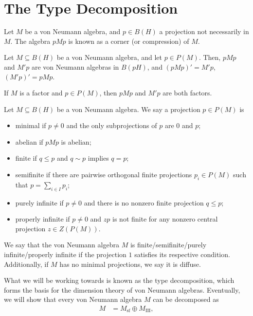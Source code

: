 \documentclass[10pt]{mypackage}
\begin{document}
\section{The Type Decomposition}%
\begin{definition}
  Let $M$ be a von Neumann algebra, and $p\in B(H)$ a projection not necessarily in $M$. The algebra $pMp$ is known as a corner (or compression) of $M$.
\end{definition}
\begin{theorem}
  Let $M\subseteq B(H)$ be a von Neumann algebra, and let $p\in P(M)$. Then, $pMp$ and $M'p$ are von Neumann algebras in $B(pH)$, and $\left( pMp \right)' = M'p$, $\left( M'p \right)' = pMp$.
\end{theorem}
\begin{corollary}
  If $M$ is a factor and $p\in P(M)$, then $pMp$ and $M'p$ are both factors.
\end{corollary}
\begin{definition}
  Let $M\subseteq B(H)$ be a von Neumann algebra. We say a projection $p\in P(M)$ is
  \begin{itemize}
    \item minimal if $p\neq 0$ and the only subprojections of $p$ are $0$ and $p$;
    \item abelian if $pMp$ is abelian;
    \item finite if $q\leq p$ and $q\sim p$ implies $q = p$;
    \item semifinite if there are pairwise orthogonal finite projections $p_i\in P(M)$ such that $p = \sum_{i\in I}p_i$;
    \item purely infinite if $p\neq 0$ and there is no nonzero finite projection $q\leq p$;
    \item properly infinite if $p\neq 0$ and $zp$ is not finite for any nonzero central projection $z\in Z(P(M))$.
  \end{itemize}
  We say that the von Neumann algebra $M$ is finite/semifinite/purely infinite/properly infinite if the projection $1$ satisfies its respective condition. Additionally, if $M$ has no minimal projections, we say it is diffuse.
\end{definition}
What we will be working towards is known as the type decomposition, which forms the basis for the dimension theory of von Neumann algebras. Eventually, we will show that every von Neumann algebra $M$ can be decomposed as
\begin{align*}
  M &= M_{\text{sf}}\oplus M_{\text{III}},
\end{align*}
\end{document}
